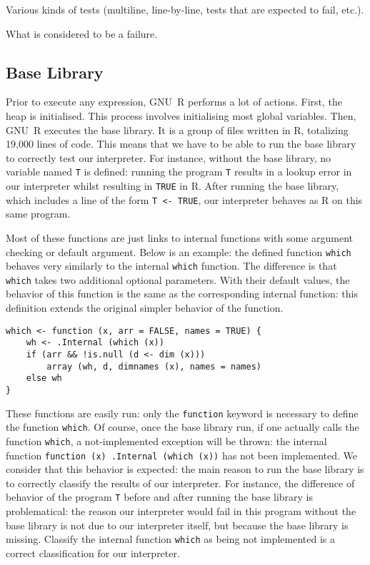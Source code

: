 \documentclass[
    sigplan,
    10pt,
    review, %
    natbib=false %
 ]{acmart}
\begin{document}
\todo{}

Various kinds of tests (multiline, line-by-line, tests that are expected to fail, etc.).

What is considered to be a failure.

\subsection{Base Library}
\label{sec:library}

Prior to execute any expression, GNU~R performs a lot of actions.
First, the heap is initialised.
This process involves initialising most global variables.
Then, GNU~R executes the base library.
It is a group of files written in R,
totalizing 19,000 lines of code.
%
This means that we have to be able to run the base library
to correctly test our interpreter.
For instance, without the base library,
no variable named \texttt{T} is defined:
running the program \texttt{T} results in a lookup error
in our interpreter whilst resulting in \texttt{TRUE} in R.
After running the base library,
which includes a line of the form \texttt{T <- TRUE},
our interpreter behaves as R on this same program.

Most of these functions are just links to internal functions
with some argument checking or default argument.
Below is an example:
the defined function \texttt{which} behaves very similarly
to the internal \texttt{which} function.
The difference is that \texttt{which} takes two additional
optional parameters.
With their default values, the behavior of this function
is the same as the corresponding internal function:
this definition extends the original simpler behavior of the function.
\begin{verbatim}
which <- function (x, arr = FALSE, names = TRUE) {
    wh <- .Internal (which (x))
    if (arr && !is.null (d <- dim (x)))
        array (wh, d, dimnames (x), names = names)
    else wh
}
\end{verbatim}

These functions are easily run:
only the \texttt{function} keyword is necessary
to define the function \texttt{which}.
Of course, once the base library run,
if one actually calls the function \texttt{which},
a not-implemented exception will be thrown:
the internal function \texttt{function (x) .Internal (which (x))}
has not been implemented.
%
We consider that this behavior is expected:
the main reason to run the base library is to correctly
classify the results of our interpreter.
For instance, the difference of behavior of the program \texttt{T}
before and after running the base library is problematical:
the reason our interpreter would fail in this program without the base library
is not due to our interpreter itself, but because the base library is missing.
Classify the internal function \texttt{which} as being not implemented
is a correct classification for our interpreter.
\end{document}
